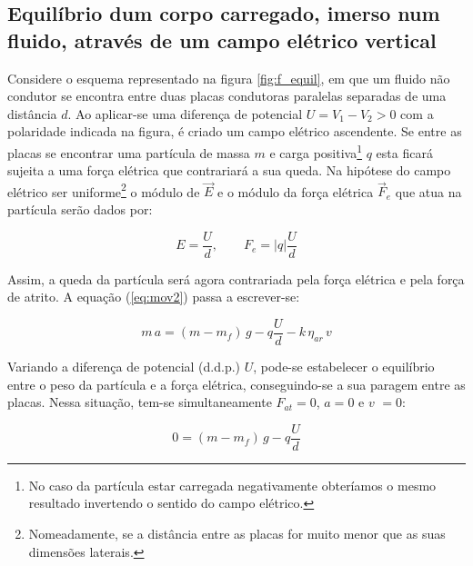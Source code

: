 \documentclass[a4paper,twoside,12pt]{article}      %
\begin{document}

    \subsection{\sf Equilíbrio dum corpo carregado, imerso num fluido, através de um campo elétrico vertical}

    Considere o esquema representado na figura \ref{fig:f_equil}, em que um fluido não condutor se encontra entre duas placas condutoras paralelas separadas de uma distância $d$. Ao aplicar-se uma diferença de potencial \mbox{$U = V_1 -V_2 > 0$} com a polaridade indicada na figura, é criado um campo elétrico ascendente. Se entre as placas se encontrar uma partícula de massa $m$ e carga positiva\footnote{No caso da partícula estar carregada negativamente obteríamos o mesmo resultado invertendo o sentido do campo elétrico.} $q$  esta ficará sujeita a uma força elétrica que contrariará a sua queda.
    Na hipótese do campo elétrico ser uniforme\footnote{Nomeadamente, se a distância entre as placas for muito menor que as suas dimensões laterais.} o módulo de $\vec{E}$ e o módulo da força elétrica $\vec{F}_e$ que atua na partícula serão dados por:


    \begin{equation*}
        E = \frac{U}{d}, \qquad  F_e = |q| \frac{U}{d}
    \end{equation*}



    Assim, a queda da partícula será agora contrariada pela força elétrica e pela força de atrito.
    A equação (\ref{eq:mov2}) passa a escrever-se:

    \begin{equation}
        \label{eq:mov3}
        m\,a = (m - m_f)\,g  - q \frac{U}{d} - k  \, \eta_{ar} \, v
    \end{equation}

    Variando a diferença de potencial (d.d.p.) $U$, pode-se estabelecer o equilíbrio entre o peso da partícula e a força elétrica, conseguindo-se a sua paragem entre as placas. Nessa situação, tem-se simultaneamente $F_{at}=0$, $a=0$ e  $v$  $=0$:

    \begin{equation}
        \label{eq:equil}
        0 = (m - m_f)\,g  - q \frac{U}{d} 
    \end{equation}
\end{document}
